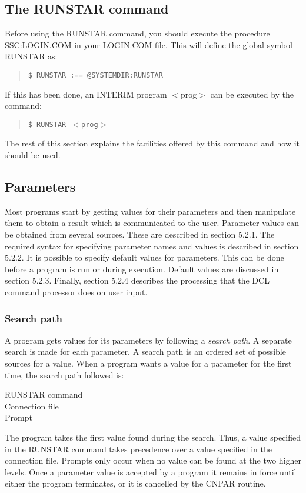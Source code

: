 \subsection {The RUNSTAR command}
Before using the RUNSTAR command, you should execute the procedure
SSC:LOGIN.COM in your LOGIN.COM file.
This will define the global symbol RUNSTAR as:
\begin{quote}
{\tt \$ RUNSTAR :== @SYSTEMDIR:RUNSTAR}
\end{quote}
If this has been done, an INTERIM program $<$prog$>$ can be executed by the command:
\begin{quote}
{\tt \$ RUNSTAR $<$prog$>$}
\end{quote}
The rest of this section explains the facilities offered by this command and how
it should be used.
\subsection {Parameters}
Most programs start by getting values for their parameters and then
manipulate them to obtain a result which is communicated to the user.
Parameter values can be obtained from several sources.
These are described in section 5.2.1.
The required syntax for specifying parameter names and values is described
in section 5.2.2.
It is possible to specify default values for parameters.
This can be done before a program is run or during execution.
Default values are discussed in section 5.2.3.
Finally, section 5.2.4 describes the processing that the DCL command processor
does on user input.
\subsubsection {Search path}
A program gets values for its parameters by following a {\em search path}.
A separate search is made for each parameter.
A search path is an ordered set of possible sources for a value.
When a program wants a value for a parameter for the first time, the search
path followed is:
\begin{description}
\begin{description}
\item [RUNSTAR command]
\item [Connection file]
\item [Prompt]
\end{description}
\end{description}
The program takes the first value found during the search.
Thus, a value specified in the RUNSTAR command takes precedence over a value
specified in the connection file.
Prompts only occur when no value can be found at the two higher levels.
Once a parameter value is accepted by a program it remains in force until
either the program terminates, or it is cancelled by the CNPAR routine.

